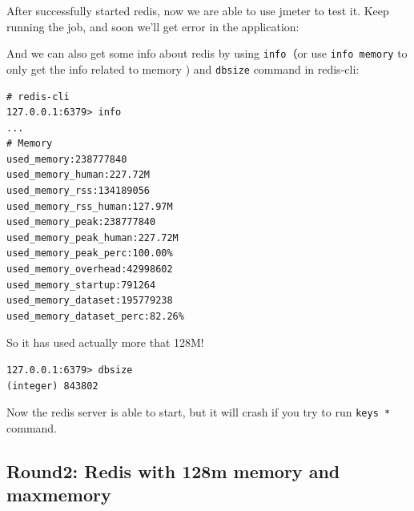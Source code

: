 \documentclass[12pt]{article}
\begin{document}
After successfully started redis, now we are able to use jmeter to test it. Keep running the job, and soon we'll get error in the application:

\begin{Shaded}
\begin{Highlighting}[]
\NormalTok{Servlet.service() for servlet [dispatcherServlet] in context with path [] threw exception [Request processing failed; nested exception is org.springframework.data.redis.RedisSystemException: }
\NormalTok{Please check the Redis logs for details about the RDB error.] with root cause}
\end{Highlighting}
\end{Shaded}

And we can also get some info about redis by using \texttt{info}（or use \texttt{info\ memory} to only get the info related to memory ) and \texttt{dbsize} command in redis-cli:

\begin{verbatim}
# redis-cli
127.0.0.1:6379> info
...
# Memory
used_memory:238777840
used_memory_human:227.72M
used_memory_rss:134189056
used_memory_rss_human:127.97M
used_memory_peak:238777840
used_memory_peak_human:227.72M
used_memory_peak_perc:100.00%
used_memory_overhead:42998602
used_memory_startup:791264
used_memory_dataset:195779238
used_memory_dataset_perc:82.26%
\end{verbatim}

So it has used actually more that 128M!

\begin{verbatim}
127.0.0.1:6379> dbsize
(integer) 843802
\end{verbatim}

Now the redis server is able to start, but it will crash if you try to run \texttt{keys\ *} command.

\subsection{Round2: Redis with 128m memory and maxmemory}\label{round2-redis-with-128m-memory-and-maxmemory}
\end{document}
